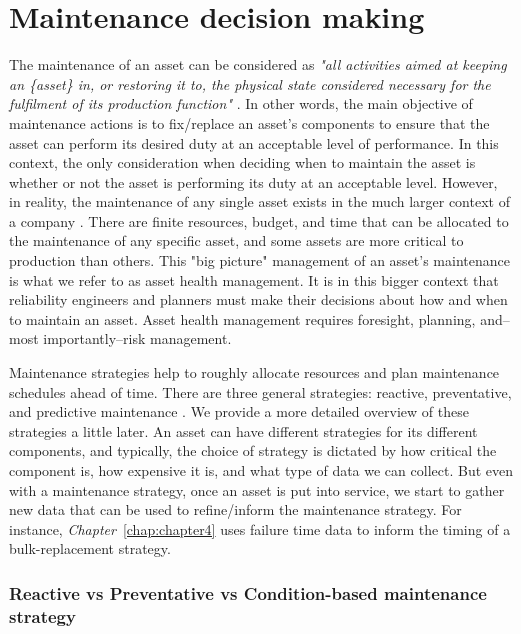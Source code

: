 \section{Maintenance decision making}
\label{sec:decisions}

The maintenance of an asset can be considered as \textit{"all activities aimed at keeping an \{asset\} in, or restoring it to, the physical state considered necessary for the fulfilment of its production function"} \citep{geraerds1985}. In other words, the main objective of maintenance actions is to fix/replace an asset's components to ensure that the asset can perform its desired duty at an acceptable level of performance. In this context, the only consideration when deciding when to maintain the asset is whether or not the asset is performing its duty at an acceptable level. However, in reality, the maintenance of any single asset exists in the much larger context of a company \citep{jardine2013}. There are finite resources, budget, and time that can be allocated to the maintenance of any specific asset, and some assets are more critical to production than others. This "big picture" management of an asset's maintenance is what we refer to as asset health management. It is in this bigger context that reliability engineers and planners must make their decisions about how and when to maintain an asset. Asset health management requires foresight, planning, and--most importantly--risk management.

Maintenance strategies help to roughly allocate resources and plan maintenance schedules ahead of time. There are three general strategies: reactive, preventative, and predictive maintenance \citep{jardine2013}. We provide a more detailed overview of these strategies a little later. An asset can have different strategies for its different components, and typically, the choice of strategy is dictated by how critical the component is, how expensive it is, and what type of data we can collect. But even with a maintenance strategy, once an asset is put into service, we start to gather new data that can be used to refine/inform the maintenance strategy. For instance, \textit{Chapter}~\ref{chap:chapter4} uses failure time data to inform the timing of a bulk-replacement strategy.

\subsubsection*{Reactive vs Preventative vs Condition-based maintenance strategy}


